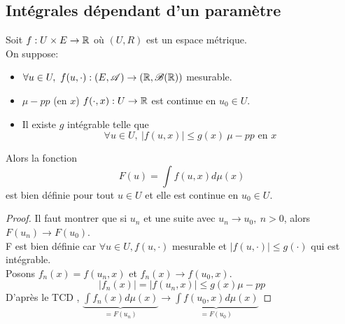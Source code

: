 \subsection{Intégrales dépendant d'un paramètre}

\begin{theorem}
	Soit $f : U \times E \to \mathbb{R}$ où $(U,R)$ est un espace métrique.\\
	On suppose:
	\begin{itemize}
		\item $\forall u \in U,\ f (u, \cdot) : (E, \mathscr{A}) \to (\mathbb{R}, \mathscr{B}(\mathbb{R}))$ mesurable.
		\item $\mu-pp$ (en $x$) $f(\cdot, x) : U  \to \mathbb{R}$ est continue en $u_0 \in U$.
		\item Il existe $g$ intégrable telle que
		      $$\forall u \in U, \ \left| f(u,x) \right| \leq g(x) \ \mu-pp \text{ en } x$$
	\end{itemize}
	Alors la fonction
	$$F (u) = \int f(u,x) d\mu(x)$$
	est bien définie pour tout $u \in U$ et elle est continue en $u_0 \in U$.
\end{theorem}


\begin{proof}
	Il faut montrer que si $u_n$ et une suite avec $u_n \to u_0, \ n > 0$, alors $F(u_n) \to F(u_0)$.\\
	F est bien définie car $\forall u \in U, f(u,\cdot)$ mesurable et $|f(u,\cdot)| \leq g(\cdot)$ qui est intégrable.\\

	Posons $f_n(x) = f(u_n,x)$ et $f_n(x) \to f(u_0,x)$.\\
	$$|f_n(x)|= |f(u_n, x)| \leq g(x) \mu-pp$$
	D'après le TCD , $\underbrace{\int f_n(x)d\mu(x)}_{=F(u_n)} \to  \underbrace{\int f(u_0, x)d\mu(x)}_{= F(u_0)}$
\end{proof}

